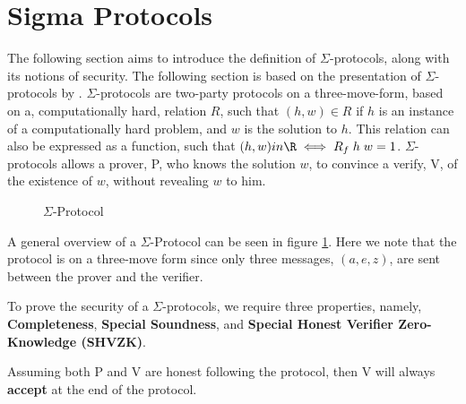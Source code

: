 \section{Sigma Protocols}
\label{sec:background:sigma_protocols}
The following section aims to introduce the definition of $\Sigma$-protocols,
along with its notions of security. The following section is based on the
presentation of $\Sigma$-protocols by \citet{on-sigma-protocols}.
$\Sigma$-protocols are two-party protocols on a three-move-form, based on a,
computationally hard, relation $R$, such that $(h, w) \in R$ if $h$ is an
instance of a computationally hard problem, and $w$ is the solution to $h$.
This relation can also be expressed as a function, such that
$(h,w) in \R \iff R_{f} \; h \; w = 1$.
$\Sigma$-protocols allows a prover, P, who knows the solution $w$, to convince a
verify, V, of the existence of $w$, without revealing $w$ to him.


\begin{figure}[ht]
  \centering
  \caption{\label{fig:proto_sigma} $\Sigma$-Protocol}
\end{figure}

A general overview of a $\Sigma$-Protocol can be seen in figure
\ref{fig:proto_sigma}. Here we note that the protocol is on a three-move form
since only three messages, $(a,e,z)$, are sent between the prover and the verifier.

\begin{definition}
\label{def:sigma:sec}
To prove the security of a $\Sigma$-protocols, we require three properties, namely,
\textbf{Completeness}, \textbf{Special Soundness}, and \textbf{Special Honest Verifier Zero-Knowledge (SHVZK)}.
\end{definition}

\begin{definition}[Completeness]
  Assuming both P and V are honest \ie following the protocol, then V will always \textbf{accept} at
  the end of the protocol.
\end{definition}

